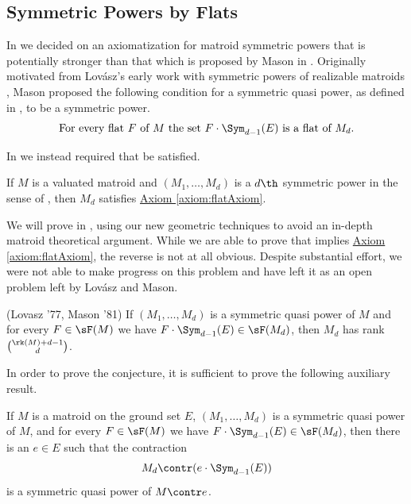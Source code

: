 \subsection{Symmetric Powers by Flats}\label{subsec:sympowByFlats}
In  we decided on an axiomatization for matroid symmetric powers that is potentially stronger than that which is proposed by Mason in \cite{MGlueing}. Originally motivated from Lov\'asz's early work with symmetric powers of realizable matroids \cite{Lovasz77}, Mason proposed the following condition for a symmetric quasi power, as defined in  , to be a symmetric power.
\begin{equation}\label{axiom:flatAxiom} 
\text{For every flat } F \text{ of } M \text{ the set } F\cdot \Sym_{d-1}(E) \text{ is a flat of } M_d.
\end{equation}

In  we instead required that  be satisfied.

\begin{proposition}\label{prop:SymprodImpliesFlats}
    If $M$ is a valuated matroid and $(M_1,\dots, M_d)$ is a $d\th$ symmetric power in the sense of , then $M_d$ satisfies \hyperref[axiom:flatAxiom]{Axiom \ref*{axiom:flatAxiom}}.
\end{proposition}

We will prove  in , using our new geometric techniques to avoid an in-depth matroid theoretical argument. While we are able to prove that  implies \hyperref[axiom:flatAxiom]{Axiom \ref*{axiom:flatAxiom}}, the reverse is not at all obvious. Despite substantial effort, we were not able to make progress on this problem and have left it as an open problem left by Lov\'asz and Mason.

\begin{conjecture}(Lovasz '77, Mason '81)\label{conj:flatcondition}
If $(M_1,\dots,M_d)$ is a symmetric quasi power of $M$ and for every $F\in \sF(M)$ we have $F\cdot \Sym_{d-1}(E)\in \sF(M_d)$, then $M_d$ has rank $\binom{\rk(M)+d-1}{d}$.
\end{conjecture}

In order to prove the conjecture, it is sufficient to prove the following auxiliary result.

\begin{conjecture}\label{conj:flatcondition2}
    If $M$ is a matroid on the ground set $E$, $(M_1,\dots,M_d)$ is a symmetric quasi power of $M$, and for every $F\in \sF(M)$ we have $F\cdot \Sym_{d-1}(E)\in \sF(M_d)$, then there is an $e\in E$ such that the contraction
    $$M_d\contr (e\cdot \Sym_{d-1}(E))$$
    is a symmetric quasi power of $M\contr e$.
\end{conjecture}


